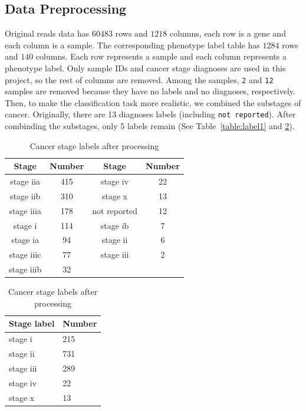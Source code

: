 \documentclass{article}
\begin{document}
\subsection{Data Preprocessing}
Original reads data has $60483$ rows and $1218$ columns, each row is a gene and each column is a sample. The corresponding phenotype label table has $1284$ rows and $140$ columns. Each row represents a sample and each column represents a phenotype label. Only sample IDs and cancer stage diagnoses are used in this project, so the rest of columns are removed. Among the samples, \texttt{2} and \texttt{12} samples are removed because they have no labels and no diagnoses, respectively. 
Then, to make the classification task more realistic, we combined the substages of cancer. Originally, there are 13 diagnoses labels (including \texttt{not reported}). After combinding the substages, only 5 labels remain (See Table~\ref{table:label1} and \ref{table:label2}).
\begin{table}[tbhp]
\parbox{0.5\linewidth}{
    \centering
    \caption{Original cancer stage labels}
    \begin{tabular}{cccc}
        \hline
        Stage      & Number & Stage        & Number \\ \hline
        stage iia  & 415    & stage iv     & 22     \\
        stage iib  & 310    & stage x      & 13     \\
        stage iiia & 178    & not reported & 12     \\
        stage i    & 114    & stage ib     & 7      \\
        stage ia   & 94     & stage ii     & 6      \\
        stage iiic & 77     & stage iii    & 2      \\
        stage iiib & 32     &              &        \\ \hline
    \end{tabular}
    \label{table:label1}
}
\hfill
\parbox{0.5\linewidth}{
    \centering
    \caption{Cancer stage labels after processing}
    \begin{tabular}{ll}
        \hline
    Stage label & Number \\ \hline
    stage i     & 215    \\
    stage ii    & 731    \\
    stage iii   & 289    \\
    stage iv    & 22     \\
    stage x     & 13     \\ \hline
    \end{tabular}
    \label{table:label2}
}
\end{table}
\end{document}
